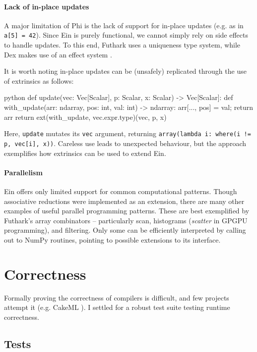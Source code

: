 \paragraph{Lack of in-place updates} A major limitation of Phi is the lack of support for in-place updates (e.g. as in \texttt{a[5] = 42}). 
Since Ein is purely functional, we cannot simply rely on side effects to handle updates.
To this end, Futhark uses a uniqueness type system, while Dex makes use of an effect system \cite{henriksen2017futhark, paszke2021getting}. 

It is worth noting in-place updates can be (unsafely) replicated through the use of extrinsics as follows: 
\begin{center}    
\begin{cminted}{python}
def update(vec: Vec[Scalar], p: Scalar, x: Scalar) -> Vec[Scalar]:
    def with_update(arr: ndarray, pos: int, val: int) -> ndarray:
        arr[..., pos] = val; return arr
    return ext(with_update, vec.expr.type)(vec, p, x)    
\end{cminted}
\end{center}
Here, \texttt{update} mutates its \texttt{vec} argument, returning \texttt{array(lambda i: where(i != p, vec[i], x))}. Careless use leads to unexpected behaviour, but the approach exemplifies how extrinsics can be used to extend Ein.


\paragraph{Parallelism} Ein offers only limited support for common computational patterns. Though associative reductions were implemented as an extension, there are many other examples of useful parallel programming patterns. These are best exemplified by Futhark's array combinators -- particularly scan, histograms (\textit{scatter} in GPGPU programming), and filtering. Only some can be efficiently interpreted by calling out to NumPy routines, pointing to possible extensions to its interface.

\section{Correctness}

Formally proving the correctness of compilers is difficult, and few projects attempt it (e.g. CakeML \cite{kumar2014cakeml}). 
I settled for a robust test suite testing runtime correctness.

\subsection{Tests}


